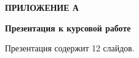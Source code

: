 \begin{center}
    \textbf{ПРИЛОЖЕНИЕ А}
\end{center}

\begin{center}
    \textbf{Презентация к курсовой работе}
\end{center}

Презентация содержит 12 слайдов.
